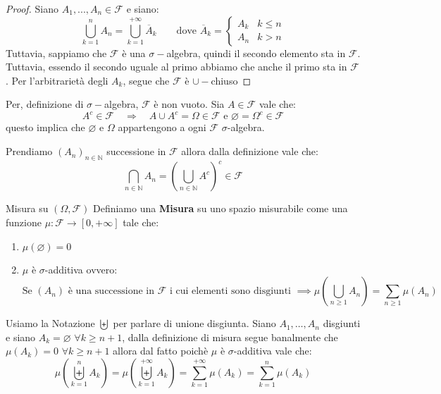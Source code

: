 \documentclass[11pt, a4paper, twoside]{article}
\begin{document}
\begin{proof}
	Siano $A_1,...,A_n \in \mathcal F$ e siano:
	\[
		\bigcup_{k=1}^n A_n = \bigcup_{k=1}^{+\infty} \overline A_k \qquad \text{dove } \overline A_k =
		\begin{cases}
			A_k & k\leq n\\
			A_n & k>n
		\end{cases}
	\]
	Tuttavia, sappiamo che $\mathcal F$ è una $\sigma-$algebra, quindi il secondo elemento sta in $\mathcal F$. Tuttavia, essendo il secondo uguale al primo abbiamo che anche il primo sta in $\mathcal F$. Per l'arbitrarietà degli $A_k$, segue che $\mathcal F$ è $\cup-$chiuso
\end{proof}
\begin{oss}
	Per, definizione di $\sigma-$algebra, $\mathcal F$ è non vuoto. Sia $A\in\mathcal F$ vale che:
	\[
		A^c  \in \mathcal F \quad\Rightarrow\quad A\cup A^c=\Omega\in \mathcal F \text{ e }\varnothing=\Omega^c\in \mathcal F
	\]
questo implica che $\varnothing$ e $\Omega$ appartengono a ogni $\mathcal F$ $\sigma$-algebra. 
\end{oss}
\begin{oss}
	Prendiamo $(A_n)_{n \in \mathbb N}$ successione in $\mathcal F$ allora dalla definizione vale che:
	\[
		\bigcap\limits_{n\in\mathbb{N}} A_n=\left(\bigcup\limits_{n\in\mathbb{N}}A^c\right)^c\in\mathcal F
	\]
\end{oss}
\begin{defn}{Misura su $(\Omega,\mathcal F)$}{}
	Definiamo una \textbf{Misura} su uno spazio misurabile come una funzione $\mu:\mathcal F\rightarrow[0,+\infty]$ tale che:
	\begin{enumerate}
		\item $\mu(\varnothing)=0$
		\item $\mu$ è $\sigma$-additiva ovvero:
		\[
			\text{Se }(A_n) \text{ è una successione in }\mathcal F \text{ i cui elementi sono disgiunti } \implies\mu(\bigcup\limits_{n\geq1}A_n)=\sum\limits_{n\geq1}\mu(A_n)
		\]
	\end{enumerate}
\end{defn}
\begin{oss}
	 Usiamo la Notazione $\biguplus$ per parlare di unione disgiunta. Siano $A_1,\dots,A_n$ disgiunti e siano $A_k=\varnothing$ $\forall k\geq n+1$, dalla definizione di misura segue banalmente che $\mu(A_k)=0$ $\forall k\geq n+1$ allora dal fatto poichè $\mu$ è $\sigma$-additiva vale che:
	\[
		\mu\left(\biguplus\limits_{k=1}^n A_k\right)=\mu\left(\biguplus\limits_{k=1}^{+\infty} A_k\right)=\sum\limits_{k=1}^{+\infty}\mu(A_k)=\sum\limits_{k=1}^n\mu(A_k)
	\]
\end{oss}
\end{document}
